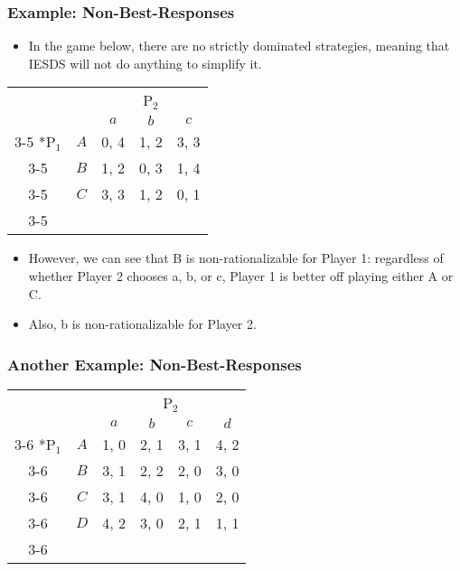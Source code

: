 \begin{frame}
\frametitle{Example: Non-Best-Responses}
\begin{itemize}
\item In 	the game below, there are no strictly dominated strategies, meaning that IESDS will not do anything to simplify it.
\end{itemize}
\begin{table}[h]
	\centering
	\setlength{\extrarowheight}{2pt}
	\begin{tabular}{cc|c|c|c|}
		& \multicolumn{1}{c}{} & \multicolumn{3}{c}{P$_2$}\\
		& \multicolumn{1}{c}{} & \multicolumn{1}{c}{$a$} & \multicolumn{1}{c}{$b$} & \multicolumn{1}{c}{$c$} \\\cline{3-5}
		\multirow{3}*{P$_1$}  & $A$ & 0, 4 & 1, 2 & 3, 3 \\\cline{3-5}
		& $B$ & 1, 2 & 0, 3 & 1, 4 \\\cline{3-5}
		& $C$ & 3, 3 & 1, 2 & 0, 1 \\\cline{3-5}
	\end{tabular}
\end{table}
\begin{itemize}
	\item However, we can see that B is non-rationalizable for Player 1: regardless of whether Player 2 chooses a, b, or c, Player 1 is better off playing either A or C.
	\item Also, b is non-rationalizable for Player 2.
\end{itemize}
\end{frame}

\begin{frame}
\frametitle{Another Example: Non-Best-Responses}
\begin{table}[h]
	\centering
	\setlength{\extrarowheight}{2pt}
	\begin{tabular}{cc|c|c|c|c|}
		& \multicolumn{1}{c}{} & \multicolumn{4}{c}{P$_2$}\\
		& \multicolumn{1}{c}{} & \multicolumn{1}{c}{$a$} & \multicolumn{1}{c}{$b$} & \multicolumn{1}{c}{$c$} & \multicolumn{1}{c}{$d$} \\\cline{3-6}
		\multirow{4}*{P$_1$}  & $A$ & 1, 0 & 2, 1 & 3, 1 & 4, 2 \\\cline{3-6}
		& $B$ & 3, 1 & 2, 2 & 2, 0 & 3, 0 \\\cline{3-6}
		& $C$ & 3, 1 & 4, 0 & 1, 0 & 2, 0 \\\cline{3-6}
		& $D$ & 4, 2 & 3, 0 & 2, 1 & 1, 1 \\\cline{3-6}
	\end{tabular}
\end{table}
\end{frame}

